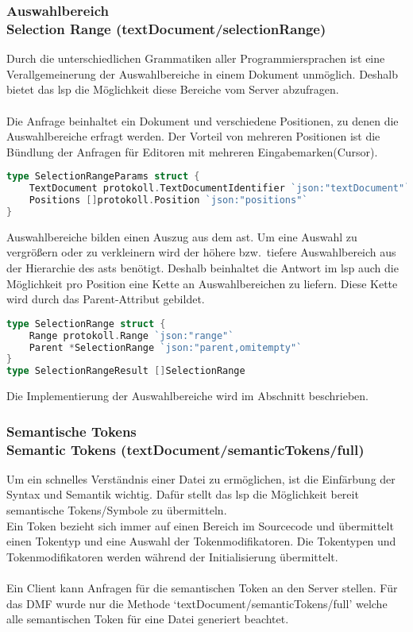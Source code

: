 \documentclass[./einleitung.tex]{subfiles}
\begin{document}
    \subsubsection[Auswahlbereich]{Auswahlbereich\\ {\textnormal{\footnotesize Selection Range (textDocument/selectionRange) \cite{selection}}}}\label{subsubsec:selection}
    Durch die unterschiedlichen Grammatiken aller Programmiersprachen ist eine Verallgemeinerung der Auswahlbereiche in einem Dokument unmöglich.
    Deshalb bietet das \acrshort{lsp} die Möglichkeit diese Bereiche vom Server abzufragen.
    \\\\
    Die Anfrage beinhaltet ein Dokument und verschiedene Positionen, zu denen die Auswahlbereiche erfragt werden.
    Der Vorteil von mehreren Positionen ist die Bündlung der Anfragen für Editoren mit mehreren Eingabemarken(Cursor).
    \begin{lstlisting}[language=Go, title=Auszug aus den Parametern, label=lst:selectionParams]
type SelectionRangeParams struct {
	TextDocument protokoll.TextDocumentIdentifier `json:"textDocument"`
	Positions []protokoll.Position `json:"positions"`
}
    \end{lstlisting}
    Auswahlbereiche bilden einen Auszug aus dem \acrshort{ast}.
    Um eine Auswahl zu vergrößern oder zu verkleinern wird der höhere bzw.\ tiefere Auswahlbereich aus der Hierarchie des \acrshort{ast}s benötigt.
    Deshalb beinhaltet die Antwort im \acrshort{lsp} auch die Möglichkeit pro Position eine Kette an Auswahlbereichen zu liefern.
    Diese Kette wird durch das Parent-Attribut gebildet.
    \begin{lstlisting}[language=Go, title=Antwort des Servers, label=lst:selectionResult]
type SelectionRange struct {
	Range protokoll.Range `json:"range"`
	Parent *SelectionRange `json:"parent,omitempty"`
}
type SelectionRangeResult []SelectionRange
    \end{lstlisting}
    Die Implementierung der Auswahlbereiche wird im Abschnitt  beschrieben.

    \subsubsection[Semantische Tokens]{Semantische Tokens\\ {\textnormal{\footnotesize Semantic Tokens (textDocument/semanticTokens/full) \cite{semantic}}}}\label{subsubsec:semantic}
    Um ein schnelles Verständnis einer Datei zu ermöglichen, ist die Einfärbung der Syntax und Semantik wichtig.
    Dafür stellt das \acrshort{lsp} die Möglichkeit bereit semantische Tokens/Symbole zu übermitteln.\\
    Ein Token bezieht sich immer auf einen Bereich im Sourcecode und übermittelt einen Tokentyp und eine Auswahl der Tokenmodifikatoren.
    Die Tokentypen und Tokenmodifikatoren werden während der Initialisierung übermittelt.
    \\\\
    Ein Client kann Anfragen für die semantischen Token an den Server stellen.
    Für das DMF wurde nur die Methode `textDocument/semanticTokens/full' welche alle semantischen Token für eine Datei generiert beachtet.
\end{document}

